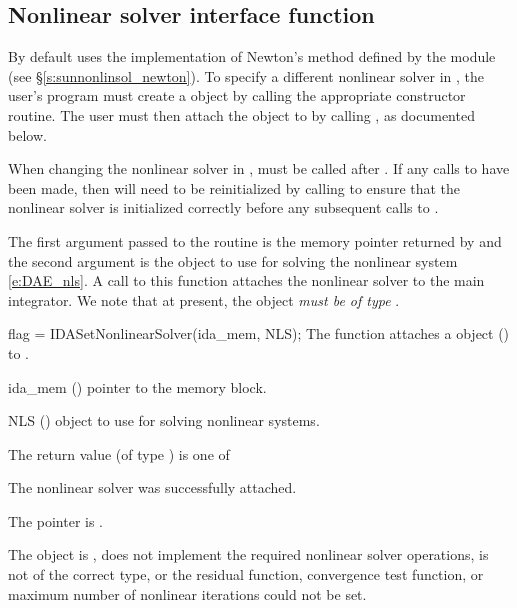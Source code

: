\subsection{Nonlinear solver interface function}
\label{sss:nonlin_solv_init}

By default {\ida} uses the {\sunnonlinsol} implementation of Newton's method
defined by the {\sunnonlinsolnewton} module (see \S\ref{s:sunnonlinsol_newton}).
To specify a different nonlinear solver in {\ida}, the user's program must
create a {\sunnonlinsol} object by calling the appropriate constructor routine.
The user must then attach the {\sunnonlinsol} object to {\ida} by calling
, as documented below.

When changing the nonlinear solver in {\ida},  must
be called after . If any calls to  have been made, then
{\ida} will need to be reinitialized by calling  to ensure
that the nonlinear solver is initialized correctly before any subsequent calls
to .

The first argument passed to the routine  is the
{\ida} memory pointer returned by  and the second argument is
the {\sunnonlinsol} object to use for solving the nonlinear system
\ref{e:DAE_nls}.
A call to this function attaches the nonlinear solver to the main {\ida}
integrator. We note that at present, the {\sunnonlinsol} object
\emph{must be of type} .

{
  flag = IDASetNonlinearSolver(ida\_mem, NLS);
}
{
  The function  attaches a {\sunnonlinsol}
  object () to {\ida}.
}
{
  \begin{args}
  \item[ida\_mem] ()
    pointer to the {\ida} memory block.
  \item[NLS] ()
    {\sunnonlinsol} object to use for solving nonlinear systems.
  \end{args}
}
{
  The return value  (of type ) is one of
  \begin{args}
  \item[\Id{IDA\_SUCCESS}]
    The nonlinear solver was successfully attached.
  \item[\Id{IDA\_MEM\_NULL}]
    The  pointer is .
  \item[\Id{IDA\_ILL\_INPUT}]
    The {\sunnonlinsol} object is , does not implement the required
    nonlinear solver operations, is not of the correct type, or the residual
    function, convergence test function, or maximum number of nonlinear
    iterations could not be set.
  \end{args}
}
{}

